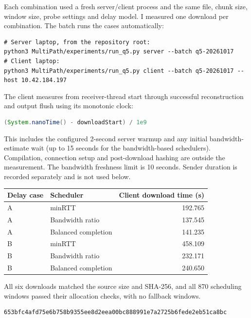 \documentclass[11pt,a4paper]{article}
\begin{document}
Each combination used a fresh server/client process and the same file, chunk size,
window size, probe settings and delay model. I measured one download per combination.
The batch runs the cases automatically:


\begin{lstlisting}
# Server laptop, from the repository root:
python3 MultiPath/experiments/run_q5.py server --batch q5-20261017
# Client laptop:
python3 MultiPath/experiments/run_q5.py client --batch q5-20261017 --host 10.42.184.197
\end{lstlisting}

The client measures from receiver-thread start through successful reconstruction
and output flush using its monotonic clock:


\begin{lstlisting}[language=Java]
(System.nanoTime() - downloadStart) / 1e9
\end{lstlisting}

This includes the configured 2-second server warmup and any initial bandwidth-estimate
wait (up to 15 seconds for the bandwidth-based schedulers). Compilation, connection
setup and post-download hashing are outside the measurement. The bandwidth freshness
limit is 10 seconds. Sender duration is recorded separately and is not used below.


\begin{center}\begin{tabular}{llr}\toprule
Delay case & Scheduler & Client download time (s) \\
\midrule
A & minRTT & 192.765 \\
A & Bandwidth ratio & 137.545 \\
A & Balanced completion & 141.235 \\
B & minRTT & 458.109 \\
B & Bandwidth ratio & 232.171 \\
B & Balanced completion & 240.650 \\
\bottomrule\end{tabular}\end{center}

All six downloads matched the source size and SHA-256, and all 870 scheduling
windows passed their allocation checks, with no fallback windows.


\begin{lstlisting}
653bfc4afd75e6b758b9355ee8d2eea00bc888991e7a2725b6fede2eb51ca8bc
\end{lstlisting}
\end{document}
